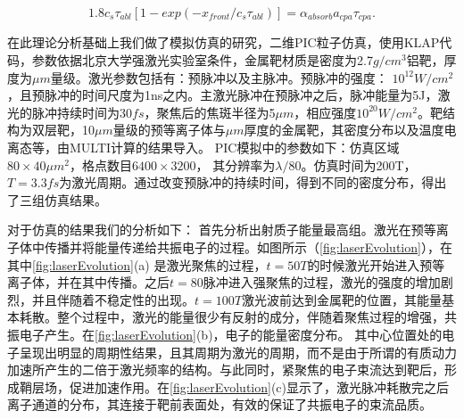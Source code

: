 \begin{equation}
\label{eqn:OptimalCondition}
{1.8} c_s {\tau}_{abl}[1-exp(-x_{front}/{c_s{\tau}_{abl}})] 
 = {\alpha}_{absorb} a_{cpa} \tau_{cpa}.
\end{equation}







在此理论分析基础上我们做了模拟仿真的研究，二维PIC粒子仿真，使用KLAP代码，参数依据北京大学强激光实验室条件，金属靶材质是密度为2.7$g/cm^3$铝靶，厚度为$\mu m$量级。激光参数包括有：预脉冲以及主脉冲。预脉冲的强度： $10^12W/cm^2$，且预脉冲的时间尺度为1ns之内。主激光脉冲在预脉冲之后，脉冲能量为5J，激光的脉冲持续时间为$30fs$，聚焦后的焦斑半径为5$\mu m$，相应强度$10^20W/cm^2$。靶结构为双层靶，10$\mu  m$量级的预等离子体与$\mu m$厚度的金属靶，其密度分布以及温度电离态等，由MULTI计算的结果导入。 PIC模拟中的参数如下：仿真区域$80 \times 40 \mu m^2$，格点数目$6400 \times 3200$， 其分辨率为$\lambda / 80$。仿真时间为200T， $T=3.3fs$为激光周期。通过改变预脉冲的持续时间，得到不同的密度分布，得出了三组仿真结果。



对于仿真的结果我们的分析如下：
首先分析出射质子能量最高组。激光在预等离子体中传播并将能量传递给共振电子的过程。如图所示（\ref{fig:laserEvolution}），在其中\ref{fig:laserEvolution}(a) 是激光聚焦的过程，$t=50T$的时候激光开始进入预等离子体，并在其中传播。之后$t=80$脉冲进入强聚焦的过程，激光的强度的增加剧烈，并且伴随着不稳定性的出现。$t=100T$激光波前达到金属靶的位置，其能量基本耗散。整个过程中，激光的能量很少有反射的成分，伴随着聚焦过程的增强，共振电子产生。在\ref{fig:laserEvolution}(b)，电子的能量密度分布。 其中心位置处的电子呈现出明显的周期性结果，且其周期为激光的周期，而不是由于所谓的有质动力加速所产生的二倍于激光频率的结构。与此同时，紧聚焦的电子束流达到靶后，形成鞘层场，促进加速作用。在\ref{fig:laserEvolution}(c)显示了，激光脉冲耗散完之后离子通道的分布，其连接于靶前表面处，有效的保证了共振电子的束流品质。


